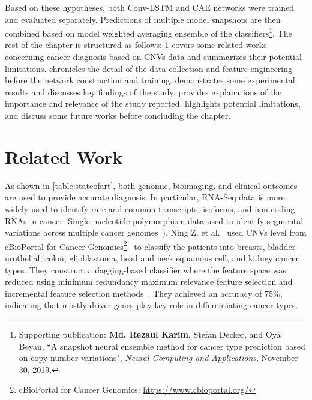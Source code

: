 \hspace*{3.5mm} Based on these hypotheses, both {Conv-LSTM} and CAE networks were trained and evaluated separately. Predictions of multiple model snapshots are then combined based on model weighted averaging ensemble of the classifiers\footnote{Supporting publication: \textbf{Md. Rezaul Karim}, Stefan Decker, and Oya Beyan, ``A snapshot neural ensemble method for cancer type prediction based on copy number variations", \emph{Neural Computing and Applications}, November 30, 2019.}.  %
The rest of the chapter is structured as follows:
\cref{chapter_3:rw} covers some related works concerning cancer diagnosis based on CNVs data and summarizes their potential limitations.  chronicles the detail of the data collection and feature engineering before the network construction and training.  demonstrates some experimental results and discusses key findings of the study.  provides explanations of the importance and relevance of the study reported, highlights potential limitations, and discuss some future works before concluding the chapter. 

\section{Related Work}\label{chapter_3:rw}
As shown in \cref{table:stateofart}, both genomic, bioimaging, and clinical outcomes~\cite{min} are used to provide accurate diagnosis. In particular, RNA-Seq data is more widely used to identify rare and common transcripts, isoforms, and non-coding RNAs in cancer. Single nucleotide polymorphism data used to identify segmental variations across multiple cancer genomes~\cite{82Tomczak,95Gaul}). Ning Z. et al.~\cite{zhang2016classification} used CNVs level from cBioPortal for Cancer Genomics\footnote{cBioPortal for Cancer Genomics: \url{https://www.cbioportal.org/}}~\cite{cerami2012cbio} to classify the patients into breasts, bladder urothelial, colon, glioblastoma, head and neck squamous cell, and kidney cancer types. They construct a dagging-based classifier where the feature space was reduced using minimum redundancy maximum relevance feature selection and incremental feature selection methods~\cite{zhang2016classification}. They achieved an accuracy of 75\%, indicating that mostly driver genes play key role in differentiating cancer types. 

